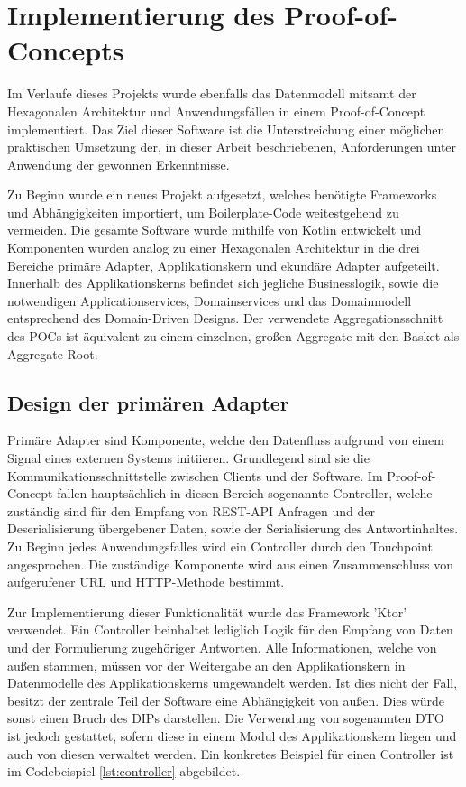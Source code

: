 \chapter{Implementierung des Proof-of-Concepts}

Im Verlaufe dieses Projekts wurde ebenfalls das Datenmodell mitsamt der Hexagonalen Architektur und Anwendungsfällen in einem Proof-of-Concept implementiert. Das Ziel dieser Software ist die Unterstreichung einer möglichen praktischen Umsetzung der, in dieser Arbeit beschriebenen, Anforderungen unter Anwendung der gewonnen Erkenntnisse. 

Zu Beginn wurde ein neues Projekt aufgesetzt, welches benötigte Frameworks und Abhängigkeiten importiert, um Boilerplate-Code weitestgehend zu vermeiden. Die gesamte Software wurde mithilfe von Kotlin entwickelt und Komponenten wurden analog zu einer Hexagonalen Architektur in die drei Bereiche primäre Adapter, Applikationskern und ekundäre Adapter aufgeteilt. Innerhalb des Applikationskerns befindet sich jegliche Businesslogik, sowie die notwendigen Applicationservices, Domainservices und das Domainmodell entsprechend des Domain-Driven Designs. Der verwendete Aggregationsschnitt des POCs ist äquivalent zu einem einzelnen, großen Aggregate mit den Basket als Aggregate Root.


\section{Design der primären Adapter}

Primäre Adapter sind Komponente, welche den Datenfluss aufgrund von einem Signal eines externen Systems initiieren. Grundlegend sind sie die Kommunikationsschnittstelle zwischen Clients und der Software. Im Proof-of-Concept fallen hauptsächlich in diesen Bereich sogenannte Controller, welche zuständig sind für den Empfang von REST-API Anfragen und der Deserialisierung übergebener Daten, sowie der Serialisierung des Antwortinhaltes. Zu Beginn jedes Anwendungsfalles wird ein Controller durch den Touchpoint angesprochen. Die zuständige Komponente wird aus einen Zusammenschluss von aufgerufener URL und HTTP-Methode bestimmt. 

Zur Implementierung dieser Funktionalität wurde das Framework 'Ktor' verwendet. Ein Controller beinhaltet lediglich Logik für den Empfang von Daten und der Formulierung zugehöriger Antworten. Alle Informationen, welche von außen stammen, müssen vor der Weitergabe an den Applikationskern in Datenmodelle des Applikationskerns umgewandelt werden. Ist dies nicht der Fall, besitzt der zentrale Teil der Software eine Abhängigkeit von außen. Dies würde sonst einen Bruch des \acrlong{DIP}s darstellen. Die Verwendung von sogenannten \acrfull{DTO} ist jedoch gestattet, sofern diese in einem Modul des Applikationskern liegen und auch von diesen verwaltet werden. Ein konkretes Beispiel für einen Controller ist im Codebeispiel \ref{lst:controller} abgebildet.

